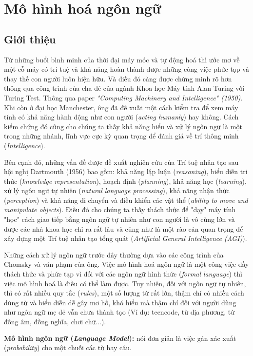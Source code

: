 \section{Mô hình hoá ngôn ngữ}
\subsection{Giới thiệu}
 Từ những buổi bình minh của thời đại máy móc và tự động hoá thì ước mơ về một cỗ máy có trí tuệ và khả năng hoàn thành được những công việc phức tạp và thay thế con người luôn hiện hữu. Và điều đó càng được chứng minh rõ hơn thông qua công trình của cha đẻ của ngành Khoa học Máy tính Alan Turing với Turing Test.  Thông qua paper \textit{"Computing Machinery and Intelligence" (1950)}. Khi còn ở đại học Manchester, ông đã đề xuất một cách kiểm tra để xem máy tính có khả năng hành động như con người (\textit{acting humanly}) hay không.
Cách kiểm chứng đó cũng cho chúng ta thấy khả năng hiểu và xử lý ngôn ngữ là một trong những nhánh, lĩnh vực cực kỳ quan trọng để đánh giá về trí thông minh (\textit{Intelligence}).

Bên cạnh đó, những vấn đề được đề xuất nghiên cứu của Trí tuệ nhân tạo sau hội nghị Dartmouth (1956) bao gồm: khả năng lập luận (\textit{reasoning}), biểu diễn tri thức (\textit{knowledge representation}), hoạch định (\textit{planning}), khả năng học (\textit{learning}), xử lý ngôn ngữ tự nhiên (\textit{natural language processing}), khả năng nhận thức (\textit{perception}) và khả năng di chuyển và điều khiển các vật thể (\textit{ability to move and manipulate objects}).
Điều đó cho chúng ta thấy thách thức để "dạy" máy tính "học" cách giao tiếp bằng ngôn ngữ tự nhiên như con người là vô cùng lớn và được các nhà khoa học chỉ ra rất lâu và cũng như là một rào cản quan trọng để xây dựng một Trí tuệ nhân tạo tổng quát (\textit{Artificial General Intelligence (AGI)}).

Những cách xử lý ngôn ngữ trước đây thường dựa vào các công trình của Chomsky và văn phạm của ông. Việc mô hình hoá ngôn ngữ là một công việc đầy thách thức và phức tạp vì đối với các ngôn ngữ hình thức (\textit{formal language}) thì việc mô hình hoá là điều có thể làm được. Tuy nhiên, đối với ngôn ngữ tự nhiên, thì có rất nhiều quy tắc (\textit{rules}), một số lượng từ rất lớn, thậm chí có nhiều cách dùng từ và
biểu diễn dễ gây mơ hồ, khó hiểu mà thậm chí đối với người dùng như ngôn ngữ mẹ đẻ vẫn chưa thành tạo (Ví dụ: teencode, từ địa phương, từ đồng âm, đồng nghĩa, chơi chữ...).

\textbf{Mô hình ngôn ngữ (\textit{Language Model}):} nói đơn giản là việc gán xác xuất (\textit{probability}) cho một chuỗi các từ hay câu.

